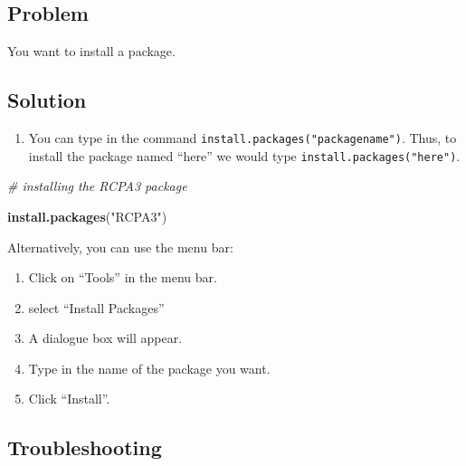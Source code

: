 \documentclass[
]{book}
\newenvironment{Shaded}{\begin{snugshade}}{\end{snugshade}}
\newcommand{\CommentTok}[1]{\textcolor[rgb]{0.56,0.35,0.01}{\textit{#1}}}
\newcommand{\FunctionTok}[1]{\textcolor[rgb]{0.13,0.29,0.53}{\textbf{#1}}}
\newcommand{\NormalTok}[1]{#1}
\newcommand{\StringTok}[1]{\textcolor[rgb]{0.31,0.60,0.02}{#1}}
\providecommand{\tightlist}{%
  \setlength{\itemsep}{0pt}\setlength{\parskip}{0pt}}
\begin{document}
\hypertarget{problem-6}{%
\subsection{Problem}\label{problem-6}}

You want to install a package.

\hypertarget{solution-6}{%
\subsection{Solution}\label{solution-6}}

\begin{enumerate}
\def\labelenumi{\arabic{enumi}.}
\tightlist
\item
  You can type in the command \texttt{install.packages("packagename")}. Thus, to install the package named ``here'' we would type \texttt{install.packages("here")}.
\end{enumerate}

\begin{Shaded}
\begin{Highlighting}[]
\CommentTok{\# installing the RCPA3 package}

\FunctionTok{install.packages}\NormalTok{(}\StringTok{"RCPA3"}\NormalTok{)}
\end{Highlighting}
\end{Shaded}

Alternatively, you can use the menu bar:

\begin{enumerate}
\def\labelenumi{\arabic{enumi}.}
\tightlist
\item
  Click on ``Tools'' in the menu bar.
\item
  select ``Install Packages''
\item
  A dialogue box will appear.
\item
  Type in the name of the package you want.
\item
  Click ``Install''.
\end{enumerate}

\hypertarget{troubleshooting-4}{%
\subsection{Troubleshooting}\label{troubleshooting-4}}
\end{document}
